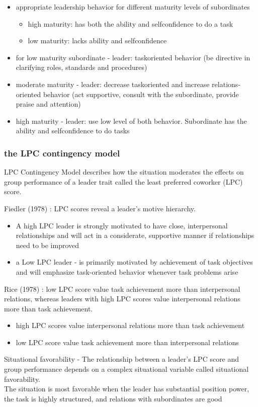 \begin{itemize}
	\item appropriate leadership behavior for different maturity levels of subordinates
	\begin{itemize}
		\item high maturity: has both the ability and self­confidence to do a task
		\item low maturity: lacks ability and self­confidence
	\end{itemize}

\item for low maturity subordinate - leader: task­oriented behavior (be directive in clarifying roles, standards and procedures)
\item moderate maturity - leader: decrease task­oriented and increase relations­oriented behavior (act supportive, consult
with the subordinate, provide praise and attention)
\item high maturity - leader: use low level of both behavior. Subordinate has the ability and self­confidence to do tasks
\end{itemize}

\subsubsection{the LPC contingency model} %
\label{ssub:the_lpc_contingency_model}
	LPC Contingency Model describes how the situation moderates the effects on group performance of a leader trait called the least preferred coworker (LPC) score.

	Fiedler (1978) : LPC scores reveal a leader’s motive hierarchy.
	\begin{itemize}
		\item A high LPC leader is strongly motivated to have close, interpersonal relationships and will act in a considerate, supportive manner if relationships need to be improved
		\item a Low LPC leader - is primarily motivated by achievement of task objectives and will emphasize task-oriented behavior whenever task problems arise
	\end{itemize}
	Rice (1978) : low LPC score value task achievement more than interpersonal relations, whereas leaders with high LPC scores value interpersonal relations more than task achievement.
	\begin{itemize}
		\item high LPC scores value interpersonal relations more than task achievement
		\item low LPC score value task achievement more than interpersonal relations
	\end{itemize}
	Situational favorability - The relationship between a leader’s LPC score and group performance depends on a complex situational variable called situational favorability.
	\\The situation is most favorable when the leader has substantial position power, the task is highly structured, and relations with subordinates are good

